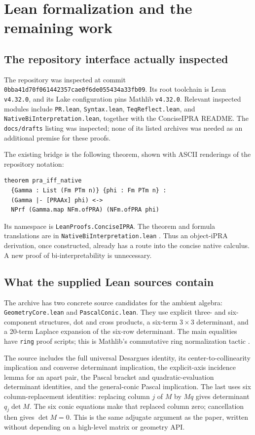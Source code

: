 \section{Lean formalization and the remaining work}\label{sec:lean}

\subsection{The repository interface actually inspected}
The repository was inspected at commit
\texttt{0bba41d70f061442357cae0f6de055434a33fb09}.
Its root toolchain is Lean \texttt{v4.32.0}, and its Lake configuration
pins Mathlib \texttt{v4.32.0}. Relevant inspected modules include
\texttt{PR.lean}, \texttt{Syntax.lean}, \texttt{TeqReflect.lean}, and
\texttt{NativeBiInterpretation.lean}, together with the ConciseIPRA
README. The \texttt{docs/drafts} listing was inspected; none of its listed
archives was needed as an additional premise for these proofs.

The existing bridge is the following theorem, shown with ASCII
renderings of the repository notation:
\begin{lstlisting}
theorem pra_iff_native
  {Gamma : List (Fm PTm n)} {phi : Fm PTm n} :
  (Gamma |- [PRAAx] phi) <->
  NPrf (Gamma.map NFm.ofPRA) (NFm.ofPRA phi)
\end{lstlisting}
Its namespace is \texttt{LeanProofs.ConciseIPRA}. The theorem and formula
translations are in \texttt{NativeBiInterpretation.lean}
\cite{repo-bridge}. Thus an object-iPRA derivation, once constructed,
already has a route into the concise native calculus. A new proof of
bi-interpretability is unnecessary.

\subsection{What the supplied Lean sources contain}
The archive has two concrete source candidates for the ambient algebra:
\texttt{GeometryCore.lean} and \texttt{PascalConic.lean}. They use
explicit three- and six-component structures, dot and cross products,
a six-term $3\times3$ determinant, and a 20-term Laplace expansion of
the six-row determinant. The main equalities have \texttt{ring} proof
scripts; this is Mathlib's commutative ring normalization tactic
\cite{mathlib-ring}.

The source includes the full universal Desargues identity, its
center-to-collinearity implication and converse determinant implication,
the explicit-axis incidence lemma for an apart pair, the Pascal bracket
and quadratic-evaluation determinant identities, and the general-conic
Pascal implication. The last uses six column-replacement identities:
replacing column $j$ of $M$ by $Mq$ gives determinant $q_j\det M$.
The six conic equations make that replaced column zero; cancellation
then gives $\det M=0$. This is the same adjugate argument as the paper,
written without depending on a high-level matrix or geometry API.

